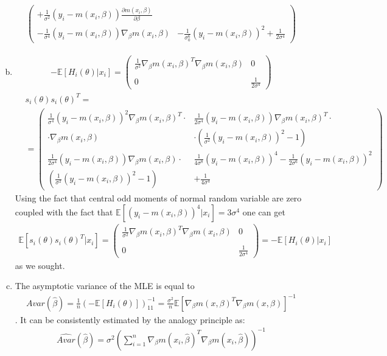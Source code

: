 \documentclass[a4paper]{article}
\newcommand{\expect}{\mathbb{E}}
\newcommand{\summa}{\sum_{i=1}^n}
\begin{document}
\begin{enumerate}[a.]
\begin{align*}
\begin{pmatrix}
	+\frac{1}{\sigma^2}(y_i - m(x_i, \beta))\frac{\partial m(x_i, \beta)}{\partial \beta} & \\
	-\frac{1}{\sigma^4}(y_i - m(x_i, \beta))\nabla_{\beta} m(x_i, \beta) & -\frac{1}{\sigma_0^6}(y_i - m(x_i, \beta))^2 + \frac{1}{2 \sigma^4}	
	\end{pmatrix}
	\end{align*}
	\item \begin{align*}
	-\expect[H_i(\theta)|x_i] = \begin{pmatrix}
	\frac{1}{\sigma^2} \nabla_{\beta} m(x_i, \beta)^T\nabla_{\beta} m(x_i, \beta)& 0\\\\
	0 & \frac{1}{2\sigma^4}
	\end{pmatrix}
	\end{align*}
	\begin{align*}
	&s_i(\theta)s_i(\theta)^T =\\&= \begin{pmatrix}
	\frac{1}{\sigma^4}(y_i - m(x_i, \beta))^2 \nabla_{\beta} m(x_i, \beta)^T \cdot & \frac{1}{2\sigma^4}(y_i - m(x_i, \beta))\nabla_{\beta} m(x_i, \beta)^T \cdot\\
	\cdot \nabla_{\beta} m(x_i, \beta) & \cdot \left(\frac{1}{\sigma^2}(y_i - m(x_i, \beta))^2 - 1\right)\\
	 \frac{1}{2\sigma^4}(y_i - m(x_i, \beta))\nabla_{\beta} m(x_i, \beta) \cdot & \frac{1}{4 \sigma^8}(y_i - m(x_i, \beta))^4 - \frac{1}{2 \sigma^6}(y_i - m(x_i, \beta))^2\\
	 \left(\frac{1}{\sigma^2}(y_i - m(x_i, \beta))^2 - 1\right)& + \frac{1}{4 \sigma^4}
	\end{pmatrix}
	\end{align*}
	Using the fact that central odd moments of normal random variable are zero coupled with the fact that $\expect[(y_i - m(x_i, \beta))^4|x_i] = 3 \sigma^4$ one can get
	\begin{align*}
	\expect[s_i(\theta)s_i(\theta)^T|x_i] = \begin{pmatrix}
	\frac{1}{\sigma^2} \nabla_{\beta} m(x_i, \beta)^T\nabla_{\beta} m(x_i, \beta) & 0\\\\
	0 & \frac{1}{2\sigma^4}
	\end{pmatrix} = - \expect[H_i(\theta)|x_i]
	\end{align*}
	as we sought.
	\item The asymptotic variance of the MLE is equal to
	\begin{align*}
	Avar(\hat{\beta}) = \frac{1}{n}\left(-\expect[H_i(\theta)]\right)^{-1}_{11} = \frac{\sigma^2}{n} \expect[\nabla_{\beta} m(x, \beta)^T\nabla_{\beta} m(x, \beta)]^{-1}
	\end{align*}. It can be consistently estimated by the analogy principle as:
	\begin{align*}
	\hat{Avar}(\hat{\beta}) = \sigma^2 \left(\summa \nabla_{\beta}m(x_i, \hat{\beta})^T\nabla_{\beta}m(x_i, \hat{\beta})\right)^{-1}
	\end{align*}
\end{enumerate}
\end{document}
